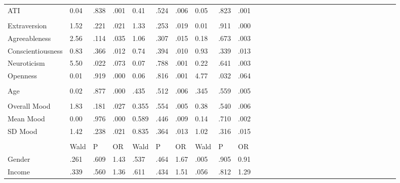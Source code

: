 \documentclass[authordate, empirical]{jote-new-article}
\begin{document}
\begin{table}[t]
\begin{fullwidth}
\begin{tabular}{@{} l l l l l l l l l l l l l l l l l l l l l l l l l l l l l l @{}}
			 ATI & 0.04 & .838 & .001 & 0.41 & .524 & .006 & 0.05 & .823 & .001 \\

			  &  &  &  &  &  &  &  &  &  \\

			 Extraversion & 1.52 & .221 & .021 & 1.33 & .253 & .019 & 0.01 & .911 & .000
			\\

			 Agreeableness & 2.56 & .114 & .035 & 1.06 & .307 & .015 & 0.18 & .673 & .003
			\\

			 Conscientiousness & 0.83 & .366 & .012 & 0.74 & .394 & .010 & 0.93 & .339
			& .013 \\

			 Neuroticism & 5.50 & .022 & .073 & 0.07 & .788 & .001 & 0.22 & .641 & .003
			\\

			 Openness & 0.01 & .919 & .000 & 0.06 & .816 & .001 & 4.77 & .032 & .064 \\

			  &  &  &  &  &  &  &  &  &  \\

			 Age & 0.02 & .877 & .000 & .435 & .512 & .006 & .345 & .559 & .005 \\

			  &  &  &  &  &  &  &  &  &  \\

			 Overall Mood & 1.83 & .181 & .027 & 0.355 & .554 & .005 & 0.38 & .540 &
			.006 \\

			 Mean Mood & 0.00 & .976 & .000 & 0.589 & .446 & .009 & 0.14 & .710 & .002
			\\

			 SD Mood & 1.42 & .238 & .021 & 0.835 & .364 & .013 & 1.02 & .316 & .015
			\\

			  &  &  &  &  &  &  &  &  &  \\

			\hline  & Wald & P & OR & Wald & P & OR & Wald & P & OR \\

			\hline Gender & .261 & .609 & 1.43 & .537 & .464 & 1.67 & .005 & .905 & 0.91
			\\

			 Income & .339 & .560 & 1.36 & .611 & .434 & 1.51 & .056 & .812 & 1.29 \\


		\end{tabular}
	\end{fullwidth}
	\end{table}
\end{document}
